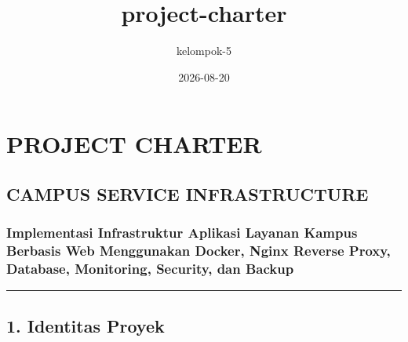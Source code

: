 \documentclass[
]{article}
\title{project-charter}
\author{kelompok-5}
\date{2026-08-20}
\begin{document}
\maketitle

\section{PROJECT CHARTER}\label{project-charter}

\subsection{CAMPUS SERVICE
INFRASTRUCTURE}\label{campus-service-infrastructure}

\subsubsection{Implementasi Infrastruktur Aplikasi Layanan Kampus
Berbasis Web Menggunakan Docker, Nginx Reverse Proxy, Database,
Monitoring, Security, dan
Backup}\label{implementasi-infrastruktur-aplikasi-layanan-kampus-berbasis-web-menggunakan-docker-nginx-reverse-proxy-database-monitoring-security-dan-backup}

\begin{center}\rule{0.5\linewidth}{0.5pt}\end{center}

\subsection{1. Identitas Proyek}\label{identitas-proyek}
\end{document}
